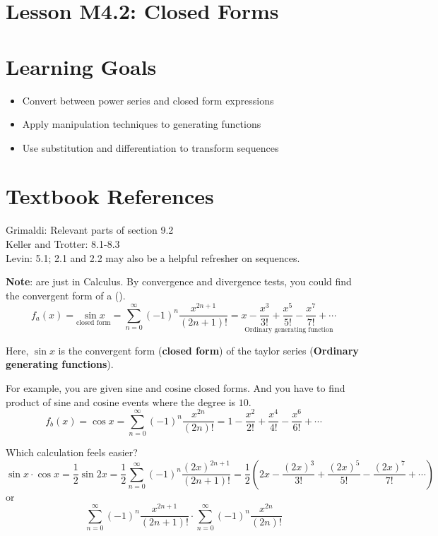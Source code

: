 \documentclass{article}
\theoremstyle{definition}
\begin{document}
\newpage



\section*{Lesson M4.2: Closed Forms}
\section*{Learning Goals}
\begin{itemize}
  \item Convert between power series and closed form expressions
  \item Apply manipulation techniques to generating functions
  \item Use substitution and differentiation to transform sequences
\end{itemize}

\section*{Textbook References}
Grimaldi: Relevant parts of section 9.2\\
Keller and Trotter: 8.1-8.3\\
Levin: 5.1; 2.1 and 2.2 may also be a helpful refresher on sequences.


\textbf{Note}: 
 are just  in Calculus.
By convergence and divergence tests, you could find the convergent form of a  ().
$$
f_a(x)=\underset{\text{closed form}}{\sin{x}} = \sum_{n=0}^{\infty} (-1)^n \frac{x^{2n+1}}{(2n+1)!} = \underset{\text{Ordinary generating function}}{x - \frac{x^3}{3!} + \frac{x^5}{5!} - \frac{x^7}{7!} + \cdots}
$$


Here, $\sin{x}$ is the convergent form (\textbf{closed form}) of the taylor series (\textbf{Ordinary generating functions}).



For example, you are given sine and cosine closed forms. And you have to find
product of sine and cosine events where the degree is $10$.
$$
f_b(x)=\cos{x} = \sum_{n=0}^{\infty} (-1)^n \frac{x^{2n}}{(2n)!} = 1 - \frac{x^2}{2!} + \frac{x^4}{4!} - \frac{x^6}{6!} + \cdots
$$

Which calculation feels easier?
$$
\sin{x} \cdot \cos{x} = \frac{1}{2} \sin{2x} = \frac{1}{2} \sum_{n=0}^{\infty} (-1)^n \frac{(2x)^{2n+1}}{(2n+1)!} = \frac{1}{2} \left(2x - \frac{(2x)^3}{3!} + \frac{(2x)^5}{5!} - \frac{(2x)^7}{7!} + \cdots\right)
$$
or
$$
\sum_{n=0}^{\infty} (-1)^n \frac{x^{2n+1}}{(2n+1)!} \cdot \sum_{n=0}^{\infty} (-1)^n \frac{x^{2n}}{(2n)!}
$$
\end{document}
